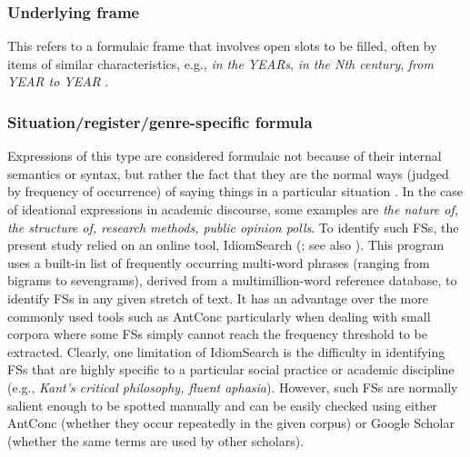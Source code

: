 \documentclass[output=paper]{langscibook}
\begin{document}
\subsubsection{Underlying frame}

This refers to a formulaic frame that involves open slots to be filled, often by items of similar characteristics, e.g., \textit{in the YEARs}, \textit{in the Nth century}, \textit{from YEAR to YEAR} \citep{Wray2008}.

\subsubsection{Situation/register/genre-specific formula}

Expressions of this type are considered formulaic not because of their internal semantics or syntax, but rather the fact that they are the normal ways (judged by frequency of occurrence) of saying things in a particular situation \citep{Wray2008,Buerki2016}. In the case of ideational expressions in academic discourse, some examples are \textit{the nature of, the structure of, research methods, public opinion polls}. To identify such FSs, the present study relied on an online tool, IdiomSearch (\citealt{Colson2016Idiom}; see also \citealt{Colson2016Set}). This program uses a built-in list of frequently occurring multi-word phrases (ranging from bigrams to sevengrams), derived from a multimillion-word reference database, to identify FSs in any given stretch of text. It has an advantage over the more commonly used tools such as AntConc particularly when dealing with small corpora where some FSs simply cannot reach the frequency threshold to be extracted. Clearly, one limitation of IdiomSearch is the difficulty in identifying FSs that are highly specific to a particular social practice or academic discipline (e.g., \textit{Kant’s critical philosophy, fluent aphasia}). However, such FSs are normally salient enough to be spotted manually and can be easily checked using either AntConc (whether they occur repeatedly in the given corpus) or Google Scholar (whether the same terms are used by other scholars).
\end{document}
